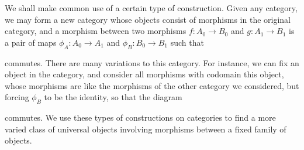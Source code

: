 We shall make common use of a certain type of construction. Given any category, we may form a new category whose objects consist of morphisms in the original category, and a morphism between two morphisms $f: A_0 \to B_0$ and $g: A_1 \to B_1$ is a pair of maps $\phi_A: A_0 \to A_1$ and $\phi_B: B_0 \to B_1$ such that
%
\begin{center}
\end{center}
%
commutes. There are many variations to this category. For instance, we can fix an object in the category, and consider all morphisms with codomain this object, whose morphisms are like the morphisms of the other category we considered, but forcing $\phi_B$ to be the identity, so that the diagram
%
\begin{center}
\end{center}
%
commutes. We use these types of constructions on categories to find a more varied class of universal objects involving morphisms between a fixed family of objects.

